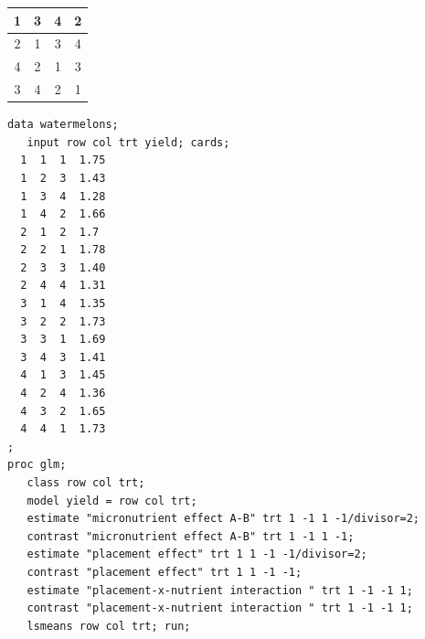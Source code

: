 \begin{center}
\begin{tabular}{|c|c|c|c|} \hline
1 & 3 & 4 & 2\\ \hline
2 & 1 & 3 & 4\\ \hline
4 & 2 & 1 & 3\\ \hline
3 & 4 & 2 & 1\\ \hline
\end{tabular}
\end{center}
\begin{small}
\begin{verbatim}
data watermelons;
   input row col trt yield; cards;
  1  1  1  1.75
  1  2  3  1.43
  1  3  4  1.28
  1  4  2  1.66
  2  1  2  1.7
  2  2  1  1.78
  2  3  3  1.40
  2  4  4  1.31
  3  1  4  1.35  
  3  2  2  1.73
  3  3  1  1.69
  3  4  3  1.41
  4  1  3  1.45
  4  2  4  1.36
  4  3  2  1.65
  4  4  1  1.73
;
proc glm; 
   class row col trt;
   model yield = row col trt;
   estimate "micronutrient effect A-B" trt 1 -1 1 -1/divisor=2;
   contrast "micronutrient effect A-B" trt 1 -1 1 -1;
   estimate "placement effect" trt 1 1 -1 -1/divisor=2;
   contrast "placement effect" trt 1 1 -1 -1;
   estimate "placement-x-nutrient interaction " trt 1 -1 -1 1; 
   contrast "placement-x-nutrient interaction " trt 1 -1 -1 1;
   lsmeans row col trt; run;
\end{verbatim}
\end{small}
\newpage
%
